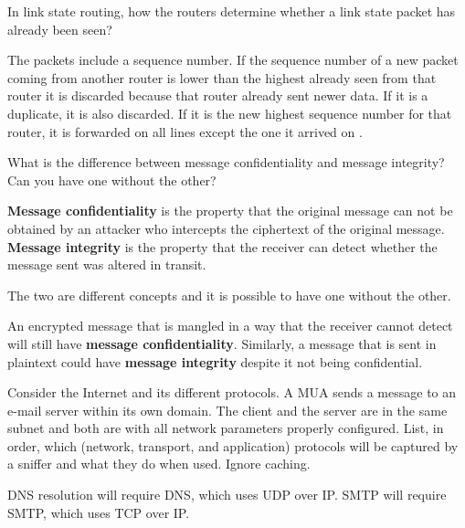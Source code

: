 \documentclass[12pt, oneside]{book}
\begin{document}
\begin{Exercise}
In link state routing, how the routers determine whether a link state packet has already been seen?
\end{Exercise}
\begin{Answer}
The packets include a sequence number. If the sequence number of a new packet coming from another router is lower than the highest already seen from that router it is discarded because that router already sent newer data. If it is a duplicate, it is also discarded. If it is the new highest sequence number for that router, it is forwarded on all lines except the one it arrived on \cite[p.~376]{computer-networks-tanenbaum-2012}.
\end{Answer}

\begin{Exercise}
\end{Exercise}

\begin{Exercise}
\end{Exercise}

\begin{Exercise}
What is the difference between message confidentiality and message integrity? Can you have one without the other?
\end{Exercise}
\begin{Answer}
\textbf{Message confidentiality} is the property that the original message can not be obtained by an attacker who intercepts the ciphertext of the original message.
\textbf{Message integrity} is the property that the receiver can detect whether the message sent was altered in transit.

The two are different concepts and it is possible to have one without the other.

An encrypted message that is mangled in a way that the receiver cannot detect will still have \textbf{message confidentiality}.
Similarly, a message that is sent in plaintext could have \textbf{message integrity} despite it not being confidential.
\end{Answer}

\begin{Exercise}
Consider the Internet and its different protocols. A MUA sends a message to an e-mail server within its own domain. The client and the server are in the same subnet and both are with all network parameters properly configured. List, in order, which (network, transport, and application) protocols will be captured by a sniffer and what they do when used. Ignore caching.
\end{Exercise}
\begin{Answer}
DNS resolution will require DNS, which uses UDP over IP.
SMTP will require SMTP, which uses TCP over IP.
\end{Answer}
\end{document}
